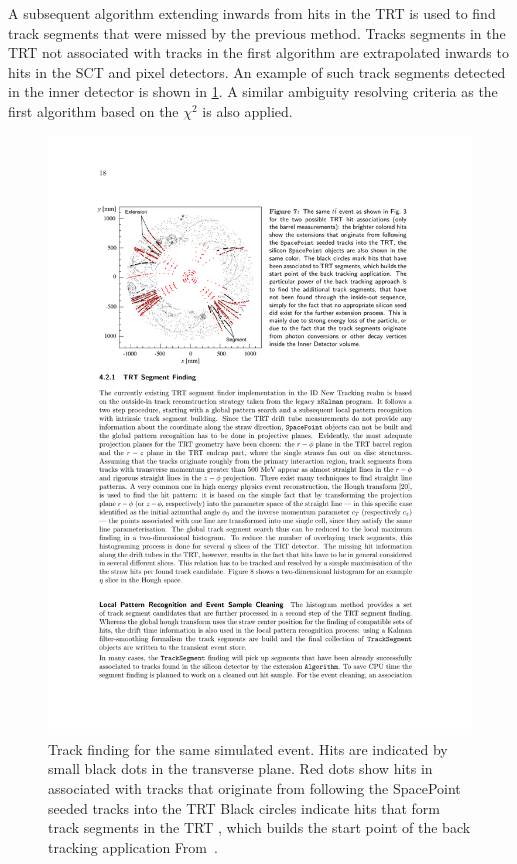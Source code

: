 A subsequent algorithm extending inwards from hits in the TRT is used to find track segments that were missed by the previous method. Tracks segments in the TRT not associated with tracks in the first algorithm are extrapolated inwards to hits in the SCT and pixel detectors. An example of such track segments detected in the inner detector is shown in \cref{fig:method:tracking-outside-in}. A similar ambiguity resolving criteria as the first algorithm based on the $\chi^2$ is also applied. 
\begin{figure}[]
    \centering
    \includegraphics[width=\mediumfigwidth]{images/tracking-outside-in.pdf}
    \caption[Track finding for a simulated \ttbar event]{Track finding for the same simulated \ttbar event.
    Hits are indicated by small black dots in the transverse plane.
    Red dots show hits in associated with tracks that originate from following the SpacePoint seeded tracks into the TRT
    Black circles indicate hits that form track segments in the TRT , which builds the start point of the back tracking application
        From~\cite{ATLAS:tracking}.}
    \label{fig:method:tracking-outside-in}
\end{figure}

